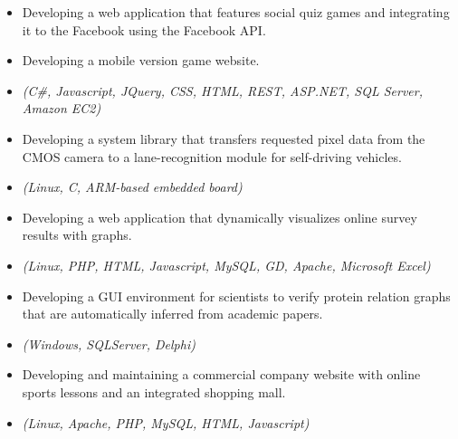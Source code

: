 \begin{itemize}
    \item{Developing a web application that features social quiz games and
        integrating it to the Facebook using the Facebook API.}
    \item{Developing a mobile version game website.}
    \item{\it\small(C\#, Javascript, JQuery, CSS, HTML, REST, ASP.NET, SQL Server, Amazon EC2)}
\end{itemize}

\begin{itemize}
    \item {Developing a system library that transfers requested pixel data from the CMOS camera
        to a lane-recognition module for self-driving vehicles.}
    \item{\it\small(Linux, C, ARM-based embedded board)}
\end{itemize}

\begin{itemize}
    \item{Developing a web application that dynamically visualizes online survey results with graphs.}
    \item{\it\small(Linux, PHP, HTML, Javascript, MySQL, GD, Apache, Microsoft Excel)}
\end{itemize}

\begin{itemize}
    \item {Developing a GUI environment for scientists to verify protein relation graphs
        that are automatically inferred from academic papers.}
    \item{\it\small(Windows, SQLServer, Delphi)}
\end{itemize}

\begin{itemize}
    \item{Developing and maintaining a commercial company website with
        online sports lessons and an integrated shopping mall.}
    \item{\it\small(Linux, Apache, PHP, MySQL, HTML, Javascript)}
\end{itemize}
